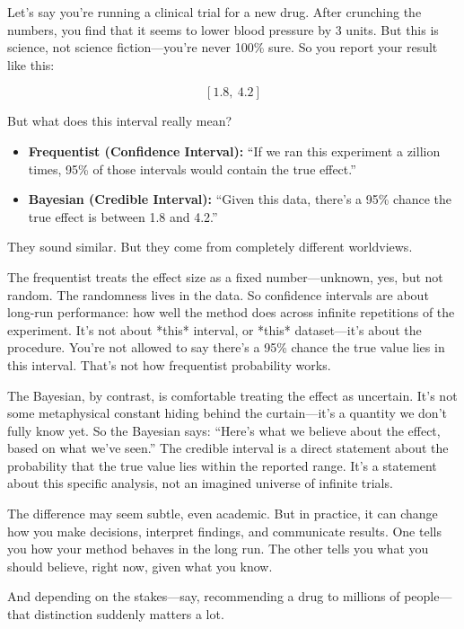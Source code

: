 Let’s say you’re running a clinical trial for a new drug. After crunching the numbers, you find that it seems to lower blood pressure by 3 units. But this is science, not science fiction—you’re never 100\% sure. So you report your result like this:

\[
[1.8,\ 4.2]
\]

But what does this interval really mean?

\begin{itemize}
    \item \textbf{Frequentist (Confidence Interval):}  
    “If we ran this experiment a zillion times, 95\% of those intervals would contain the true effect.”
    
    \item \textbf{Bayesian (Credible Interval):}  
    “Given this data, there’s a 95\% chance the true effect is between 1.8 and 4.2.”
\end{itemize}

They sound similar. But they come from completely different worldviews.

The frequentist treats the effect size as a fixed number—unknown, yes, but not random. The randomness lives in the data. So confidence intervals are about long-run performance: how well the method does across infinite repetitions of the experiment. It’s not about *this* interval, or *this* dataset—it’s about the procedure. You're not allowed to say there's a 95\% chance the true value lies in this interval. That's not how frequentist probability works.

The Bayesian, by contrast, is comfortable treating the effect as uncertain. It’s not some metaphysical constant hiding behind the curtain—it’s a quantity we don’t fully know yet. So the Bayesian says: “Here’s what we believe about the effect, based on what we’ve seen.” The credible interval is a direct statement about the probability that the true value lies within the reported range. It’s a statement about this specific analysis, not an imagined universe of infinite trials.

The difference may seem subtle, even academic. But in practice, it can change how you make decisions, interpret findings, and communicate results. One tells you how your method behaves in the long run. The other tells you what you should believe, right now, given what you know.

And depending on the stakes—say, recommending a drug to millions of people—that distinction suddenly matters a lot.




